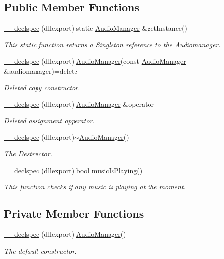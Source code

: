 \subsection*{Public Member Functions}
\begin{DoxyCompactItemize}
\item 
\hyperlink{class_audio_manager_a2d67274eaba6212be9de8761439ad3ed}{\-\_\-\-\_\-declspec} (dllexport) static \hyperlink{class_audio_manager}{Audio\-Manager} \&get\-Instance()
\begin{DoxyCompactList}\small\item\em This static function returns a Singleton reference to the Audiomanager. \end{DoxyCompactList}\item 
\hyperlink{class_audio_manager_a0a4e089fd44ae9e5179fe9e0b4ea70c5}{\-\_\-\-\_\-declspec} (dllexport) \hyperlink{class_audio_manager}{Audio\-Manager}(const \hyperlink{class_audio_manager}{Audio\-Manager} \&audiomanager)=delete
\begin{DoxyCompactList}\small\item\em Deleted copy constructor. \end{DoxyCompactList}\item 
\hyperlink{class_audio_manager_a42776044d4549a30cc408be55678c8d2}{\-\_\-\-\_\-declspec} (dllexport) \hyperlink{class_audio_manager}{Audio\-Manager} \&operator
\begin{DoxyCompactList}\small\item\em Deleted assignment opperator. \end{DoxyCompactList}\item 
\hyperlink{class_audio_manager_a4e8c79c3166b6ce297cebeacf0323241}{\-\_\-\-\_\-declspec} (dllexport)$\sim$\hyperlink{class_audio_manager}{Audio\-Manager}()
\begin{DoxyCompactList}\small\item\em The Destructor. \end{DoxyCompactList}\item 
\hyperlink{class_audio_manager_ae2a3f4f84432e899de52a644c5950435}{\-\_\-\-\_\-declspec} (dllexport) bool music\-Is\-Playing()
\begin{DoxyCompactList}\small\item\em This function checks if any music is playing at the moment. \end{DoxyCompactList}\end{DoxyCompactItemize}
\subsection*{Private Member Functions}
\begin{DoxyCompactItemize}
\item 
\hyperlink{class_audio_manager_a08b3ec802ca9bdd8eda7d50e339b32ec}{\-\_\-\-\_\-declspec} (dllexport) \hyperlink{class_audio_manager}{Audio\-Manager}()
\begin{DoxyCompactList}\small\item\em The default constructor. \end{DoxyCompactList}\end{DoxyCompactItemize}

